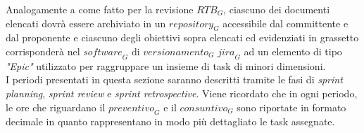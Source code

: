 Analogamente a come fatto per la revisione $\textit{RTB}_G$, ciascuno dei documenti elencati dovrà essere archiviato in un $\textit{repository}_G$ accessibile dal committente e dal proponente e ciascuno degli obiettivi sopra elencati ed evidenziati in grassetto corrisponderà nel $\textit{software}_G$ di $\textit{versionamento}_G$ $\textit{jira}_G$ ad un elemento di tipo \emph{"Epic"} utilizzato per raggruppare un insieme di task di minori dimensioni.\\
I periodi presentati in questa sezione saranno descritti tramite le fasi di \emph{sprint planning}, \emph{sprint review} e \emph{sprint retrospective}. Viene ricordato che in ogni periodo, le ore che riguardano il $\textit{preventivo}_G$ e il $\textit{consuntivo}_G$ sono riportate in formato decimale in quanto rappresentano in modo più dettagliato le task assegnate.

\begin{comment}

\begin{table}[h]
\centering
\captionsetup{justification=centering}
\begin{tabular}{|c|c|c|}
\hline
\textbf{Data di inizio} & \textbf{Data di fine prevista} & \textbf{Data di superamento della revisione PB} \\
\hline
2024/05/03 & 2024/07/05 & N/A \\
\hline
\end{tabular}
\caption{Periodo verso la revisione PB}
\end{table}

\end{comment}

\newpage

\newpage


\newpage


